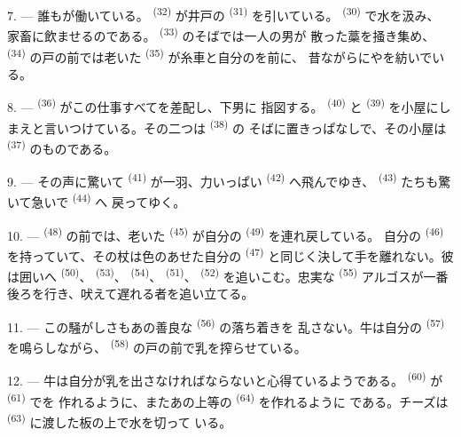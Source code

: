 7. --- 誰もが働いている。 \textsuperscript{(32)} が井戸の
\textsuperscript{(31)} を引いている。 \textsuperscript{(30)} で水を汲み、
家畜に飲ませるのである。 \textsuperscript{(33)} のそばでは一人の男が
散った藁を掻き集め、 \textsuperscript{(34)} の戸の前では老いた
 \textsuperscript{(35)} が糸車と自分のを前に、
昔ながらにやを紡いでいる。

\VUsaut{3.0mm}
\VUsaut{3.0mm}

8. ---  \textsuperscript{(36)} がこの仕事すべてを差配し、下男に
指図する。 \textsuperscript{(40)} と \textsuperscript{(39)}
を小屋にしまえと言いつけている。その二つは \textsuperscript{(38)} の
そばに置きっぱなしで、その小屋は \textsuperscript{(37)} のものである。

9. --- その声に驚いて \textsuperscript{(41)} が一羽、力いっぱい
 \textsuperscript{(42)} へ飛んでゆき、
\textsuperscript{(43)} たちも驚いて急いで \textsuperscript{(44)} へ
戻ってゆく。

10. ---  \textsuperscript{(48)} の前では、老いた
\textsuperscript{(45)} が自分の \textsuperscript{(49)} を連れ戻している。
自分の \textsuperscript{(46)} を持っていて、その杖は色のあせた自分の
 \textsuperscript{(47)} と同じく決して手を離れない。彼は囲いへ
 \textsuperscript{(50)}、 \textsuperscript{(53)}、
 \textsuperscript{(54)}、 \textsuperscript{(51)}、
 \textsuperscript{(52)} を追いこむ。忠実な
\textsuperscript{(55)} アルゴスが一番後ろを行き、吠えて遅れる者を追い立てる。

11. --- この騒がしさもあの善良な \textsuperscript{(56)} の落ち着きを
乱さない。牛は自分の \textsuperscript{(57)} を鳴らしながら、
\textsuperscript{(58)} の戸の前で乳を搾らせている。

12. --- 牛は自分が乳を出さなければならないと心得ているようである。
\textsuperscript{(60)} が \textsuperscript{(61)} でを
作れるように、またあの上等の \textsuperscript{(64)} を作れるように
である。チーズは \textsuperscript{(63)} に渡した板の上で水を切って
いる。

